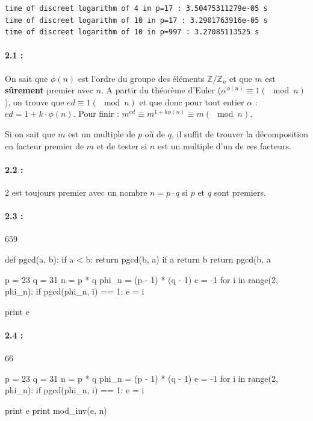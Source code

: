 \documentclass[11pt,a4paper]{report}
\begin{document}
\begin{verbatim}
time of discreet logarithm of 4 in p=17 : 3.50475311279e-05 s
time of discreet logarithm of 10 in p=17 : 3.2901763916e-05 s
time of discreet logarithm of 10 in p=997 : 3.27085113525 s
\end{verbatim}

\paragraph*{2.1 : } On sait que $\phi(n)$ est l'ordre du groupe des éléments $\mathbb{Z}/\mathbb{Z}_n$ et que $m$ est \textbf{sûrement} premier avec $n$. A partir du théorème d'Euler ($\alpha^{\phi(n)}\equiv 1(\mod n)$), on trouve que $ed \equiv 1 (\mod n)$ et que donc pour tout entier $\alpha$ : $ed = 1 + k\cdot \phi(n)$. Pour finir : $m^{ed} \equiv m^{1+k\phi(n)} \equiv m (\mod n)$.

Si on sait que $m$ est un multiple de $p$ où de $q$, il suffit de trouver la décomposition en facteur premier de $m$ et de tester si $n$ est un multiple d'un de ces facteurs.

\paragraph*{2.2 : } $2$ est toujours premier avec un nombre $n = p \cdot q$ si $p$ et $q$ sont premiers.

\paragraph*{2.3 : } $659$
\begin{pythoncode}
def pgcd(a, b):
    if a < b:
        return pgcd(b, a)
    if a %
        return b
    return pgcd(b, a %

p = 23
q = 31
n = p * q
phi_n = (p - 1) * (q - 1)
e = -1
for i in range(2, phi_n):
    if pgcd(phi_n, i) == 1:
        e = i

print e
\end{pythoncode}

\paragraph*{2.4 : } $66$
\begin{pythoncode}
p = 23
q = 31
n = p * q
phi_n = (p - 1) * (q - 1)
e = -1
for i in range(2, phi_n):
    if pgcd(phi_n, i) == 1:
        e = i

print e
print mod_inv(e, n)
\end{pythoncode}
\end{document}

